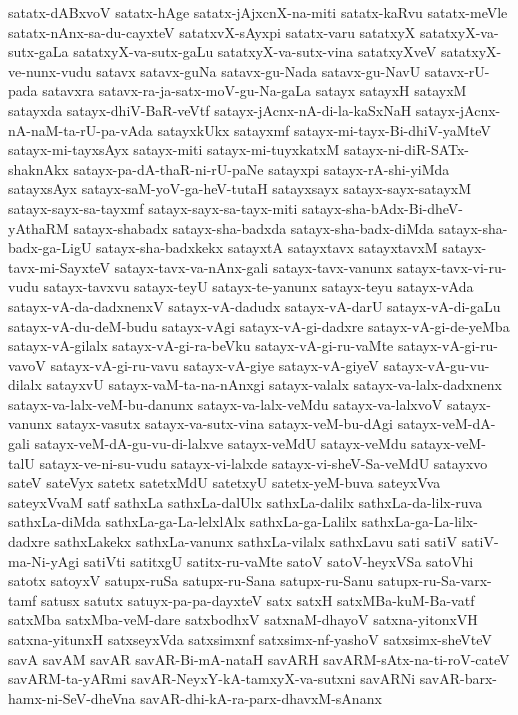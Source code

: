 {satatx-dABxvoV
satatx-hAge
satatx-jAjxcnX-na-miti
satatx-kaRvu
satatx-meVle
satatx-nAnx-sa-du-cayxteV
satatxvX-sAyxpi
satatx-varu
satatxyX
satatxyX-va-sutx-gaLa
satatxyX-va-sutx-gaLu
satatxyX-va-sutx-vina
satatxyXveV
satatxyX-ve-nunx-vudu
satavx
satavx-guNa
satavx-gu-Nada
satavx-gu-NavU
satavx-rU-pada
satavxra
satavx-ra-ja-satx-moV-gu-Na-gaLa
satayx
satayxH
satayxM
satayxda
satayx-dhiV-BaR-veVtf
satayx-jAcnx-nA-di-la-kaSxNaH
satayx-jAcnx-nA-naM-ta-rU-pa-vAda
satayxkUkx
satayxmf
satayx-mi-tayx-Bi-dhiV-yaMteV
satayx-mi-tayxsAyx
satayx-miti
satayx-mi-tuyxkatxM
satayx-ni-diR-SATx-shaknAkx
satayx-pa-dA-thaR-ni-rU-paNe
satayxpi
satayx-rA-shi-yiMda
satayxsAyx
satayx-saM-yoV-ga-heV-tutaH
satayxsayx
satayx-sayx-satayxM
satayx-sayx-sa-tayxmf
satayx-sayx-sa-tayx-miti
satayx-sha-bAdx-Bi-dheV-yAthaRM
satayx-shabadx
satayx-sha-badxda
satayx-sha-badx-diMda
satayx-sha-badx-ga-LigU
satayx-sha-badxkekx
satayxtA
satayxtavx
satayxtavxM
satayx-tavx-mi-SayxteV
satayx-tavx-va-nAnx-gali
satayx-tavx-vanunx
satayx-tavx-vi-ru-vudu
satayx-tavxvu
satayx-teyU
satayx-te-yanunx
satayx-teyu
satayx-vAda
satayx-vA-da-dadxnenxV
satayx-vA-dadudx
satayx-vA-darU
satayx-vA-di-gaLu
satayx-vA-du-deM-budu
satayx-vAgi
satayx-vA-gi-dadxre
satayx-vA-gi-de-yeMba
satayx-vA-gilalx
satayx-vA-gi-ra-beVku
satayx-vA-gi-ru-vaMte
satayx-vA-gi-ru-vavoV
satayx-vA-gi-ru-vavu
satayx-vA-giye
satayx-vA-giyeV
satayx-vA-gu-vu-dilalx
satayxvU
satayx-vaM-ta-na-nAnxgi
satayx-valalx
satayx-va-lalx-dadxnenx
satayx-va-lalx-veM-bu-danunx
satayx-va-lalx-veMdu
satayx-va-lalxvoV
satayx-vanunx
satayx-vasutx
satayx-va-sutx-vina
satayx-veM-bu-dAgi
satayx-veM-dA-gali
satayx-veM-dA-gu-vu-di-lalxve
satayx-veMdU
satayx-veMdu
satayx-veM-talU
satayx-ve-ni-su-vudu
satayx-vi-lalxde
satayx-vi-sheV-Sa-veMdU
satayxvo
sateV
sateVyx
satetx
satetxMdU
satetxyU
satetx-yeM-buva
sateyxVva
sateyxVvaM
satf
sathxLa
sathxLa-dalUlx
sathxLa-dalilx
sathxLa-da-lilx-ruva
sathxLa-diMda
sathxLa-ga-La-lelxlAlx
sathxLa-ga-Lalilx
sathxLa-ga-La-lilx-dadxre
sathxLakekx
sathxLa-vanunx
sathxLa-vilalx
sathxLavu
sati
satiV
satiV-ma-Ni-yAgi
satiVti
satitxgU
satitx-ru-vaMte
satoV
satoV-heyxVSa
satoVhi
satotx
satoyxV
satupx-ruSa
satupx-ru-Sana
satupx-ru-Sanu
satupx-ru-Sa-varx-tamf
satusx
satutx
satuyx-pa-pa-dayxteV
satx
satxH
satxMBa-kuM-Ba-vatf
satxMba
satxMba-veM-dare
satxbodhxV
satxnaM-dhayoV
satxna-yitonxVH
satxna-yitunxH
satxseyxVda
satxsimxnf
satxsimx-nf-yashoV
satxsimx-sheVteV
savA
savAM
savAR
savAR-Bi-mA-nataH
savARH
savARM-sAtx-na-ti-roV-cateV
savARM-ta-yARmi
savAR-NeyxY-kA-tamxyX-va-sutxni
savARNi
savAR-barx-hamx-ni-SeV-dheVna
savAR-dhi-kA-ra-parx-dhavxM-sAnanx
}
